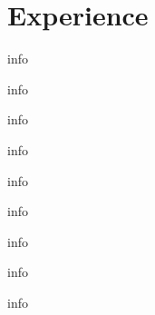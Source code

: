\documentclass[letterpaper]{resume} %
\begin{document}
\hfill
%
%
\begin{minipage}[t]{0.75\textwidth} %


	\section{Experience}

	\vspace{\topsep} %
	\begin{tightitemize}
		\item info
		\item info
		\item info
	\end{tightitemize}

	\sectionspace %


	\begin{tightitemize}
		\item info
		\item info
		\item info
	\end{tightitemize}

	\sectionspace %


	\begin{tightitemize}
		\item info
		\item info
		\item info
	\end{tightitemize}


\end{minipage}
\end{document}

